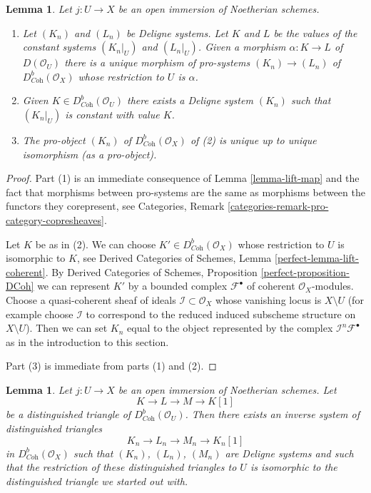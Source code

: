 \documentclass{stacks-project}
\theoremstyle{plain}
\newtheorem{lemma}[subsection]{Lemma}
\theoremstyle{definition}
\theoremstyle{remark}
\numberwithin{equation}{subsection}
\begin{document}
\begin{lemma}
\label{lemma-extension-by-zero}
Let $j : U \to X$ be an open immersion of Noetherian schemes.
\begin{enumerate}
\item Let $(K_n)$ and $(L_n)$ be Deligne systems.
Let $K$ and $L$ be the values of the constant systems
$(K_n|_U)$ and $(L_n|_U)$. Given a morphism $\alpha : K \to L$
of $D(\mathcal{O}_U)$
there is a unique morphism of pro-systems $(K_n) \to (L_n)$
of $D^b_{\textit{Coh}}(\mathcal{O}_X)$ whose restriction to $U$ is $\alpha$.
\item Given $K \in D^b_{\textit{Coh}}(\mathcal{O}_U)$ there exists a
Deligne system $(K_n)$ such that $(K_n|_U)$ is constant
with value $K$.
\item The pro-object $(K_n)$ of $D^b_{\textit{Coh}}(\mathcal{O}_X)$
of (2) is unique up to unique isomorphism (as a pro-object).
\end{enumerate}
\end{lemma}

\begin{proof}
Part (1) is an immediate consequence of Lemma \ref{lemma-lift-map}
and the fact that morphisms between pro-systems are
the same as morphisms between the functors they corepresent, see
Categories, Remark \ref{categories-remark-pro-category-copresheaves}.

\medskip\noindent
Let $K$ be as in (2). We can choose $K' \in D^b_{\textit{Coh}}(\mathcal{O}_X)$
whose restriction to $U$ is isomorphic to $K$, see
Derived Categories of Schemes, Lemma \ref{perfect-lemma-lift-coherent}.
By Derived Categories of Schemes, Proposition \ref{perfect-proposition-DCoh}
we can represent $K'$ by a bounded complex $\mathcal{F}^\bullet$
of coherent $\mathcal{O}_X$-modules. Choose a quasi-coherent sheaf
of ideals $\mathcal{I} \subset \mathcal{O}_X$ whose vanishing
locus is $X \setminus U$ (for example choose $\mathcal{I}$ to correspond
to the reduced induced subscheme structure on $X \setminus U$).
Then we can set $K_n$ equal to the object represented by the complex
$\mathcal{I}^n\mathcal{F}^\bullet$ as in the introduction
to this section.

\medskip\noindent
Part (3) is immediate from parts (1) and (2).
\end{proof}

\begin{lemma}
\label{lemma-extension-by-zero-triangle}
Let $j : U \to X$ be an open immersion of Noetherian schemes. Let
$$
K \to L \to M \to K[1]
$$
be a distinguished triangle of $D^b_{\textit{Coh}}(\mathcal{O}_U)$.
Then there exists an inverse system of distinguished triangles
$$
K_n \to L_n \to M_n \to K_n[1]
$$
in $D^b_{\textit{Coh}}(\mathcal{O}_X)$ such that $(K_n)$, $(L_n)$, $(M_n)$
are Deligne systems and such that the restriction of these
distinguished triangles to $U$ is isomorphic to the distinguished triangle
we started out with.
\end{lemma}
\end{document}
